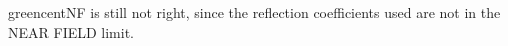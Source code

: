 
\begin{DoxyRefList}
\item[\label{bug__bug000001}%
\Hypertarget{bug__bug000001}%
File \mbox{\hyperlink{cyl_8h}{cyl.h}} ]greencent\+NF is still not right, since the reflection coefficients used are not in the N\+E\+AR F\+I\+E\+LD limit.
\end{DoxyRefList}